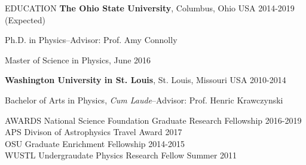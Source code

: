 \documentclass{resume} %
\newenvironment{list1}{
  \begin{list}{\ding{113}}{%
      \setlength{\itemsep}{0in}
      \setlength{\parsep}{0in} \setlength{\parskip}{0in}
      \setlength{\topsep}{0in} \setlength{\partopsep}{0in} 
      \setlength{\leftmargin}{0.17in}}}{\end{list}}
\begin{document}
\begin{rSection}{EDUCATION}
\textbf{The Ohio State University}, Columbus, Ohio USA \hfill 2014-2019 (Expected)\\
\vspace*{-.15in}
\begin{list1}
\item[] Ph.D. in Physics--Advisor: Prof. Amy Connolly
\item [] Master of Science in Physics, June 2016
\end{list1}

\textbf{Washington University in St. Louis}, St. Louis, Missouri USA \hfill 2010-2014\\
\vspace*{-.15in}
\begin{list1}
\item[] Bachelor of Arts in Physics, {\em Cum Laude}--Advisor: Prof. Henric Krawczynski
\end{list1}
\end{rSection}


\begin{rSection}{AWARDS}
National Science Foundation Graduate Research Fellowship \hfill 2016-2019 \\
APS Divison of Astrophysics Travel Award \hfill 2017 \\
OSU Graduate Enrichment Fellowship \hfill 2014-2015 \\
WUSTL Undergraudate Physics Research Fellow \hfill Summer 2011 
\end{rSection}

\end{document}
